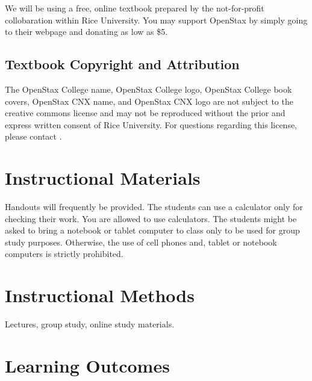 \documentclass[handout]{ximera}
\begin{document}
We will be using a free, online textbook {} prepared by the not-for-profit  collobaration within Rice University. You may support OpenStax by simply going to their webpage and donating as low as \$5.

\subsection*{Textbook Copyright and Attribution}

The OpenStax College name, OpenStax College logo, OpenStax College book covers, OpenStax CNX name, and OpenStax CNX logo are not subject to the creative commons license and may not be reproduced without the prior and express written consent of Rice University. For questions regarding this license, please contact .



\section*{Instructional Materials}

Handouts will frequently be provided. The students can use a calculator only for checking their work. You are allowed to use calculators.  The students might be asked to bring a notebook or tablet computer to class only to be used for group study purposes. Otherwise, the use of cell phones and, tablet or notebook computers is strictly prohibited. 

\section*{Instructional Methods}

Lectures, group study, online study materials.

\section*{Learning Outcomes}
\end{document}
